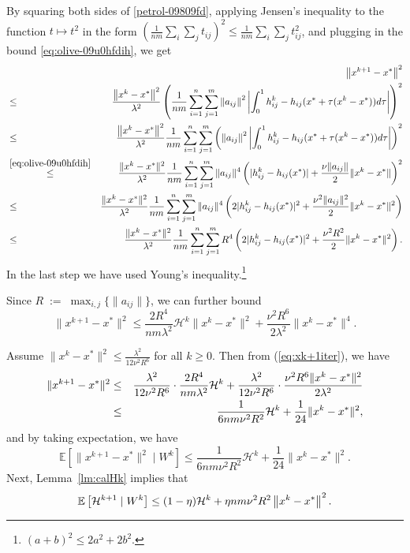 \documentclass[12pt]{article}
\newcommand{\eqdef}{\; { := }\;}
\newcommand{\ExpBr}[1]{\mathbb{E}\left[#1\right]}
\newcommand{\norm}[1]{\left\|#1\right\|}
\newcommand{\cH}{{\mathcal{H}}}
\begin{document}
\noindent By squaring both sides of \eqref{petrol-09809fd},  applying Jensen's inequality to the function $t\mapsto t^2$ in the form $\left(\frac{1}{nm}\sum_i \sum_j t_{ij}\right)^2 \leq \frac{1}{nm}\sum_i \sum_j t^2_{ij}$, and plugging in the bound \eqref{eq:olive-09u0hfdih}, we get
\begin{eqnarray*}	
&&\norm{ x^{k+1} - x^* }^2\\
&\leq&  \frac{ \norm{x^k - x^*}^2}{ \lambda^2} \left(\frac{1}{nm} \sum_{i=1}^n \sum_{j=1}^{m} \norm{a_{ij}}^2 \left|   \int_{0}^1 h_{ij}^k - h_{ij}(x^* + \tau(x^k - x^*))  d\tau  \right| \right)^2 \\
&\leq &\frac{ \norm{x^k - x^*}^2}{ \lambda^2} \frac{1}{nm} \sum_{i=1}^n \sum_{j=1}^{m} \left( \norm{a_{ij}}^2  \left| \int_{0}^1 h_{ij}^k - h_{ij}(x^* + \tau(x^k - x^*))  d\tau  \right|\right)^2 \\
&\overset{\eqref{eq:olive-09u0hfdih}}{\leq}&  \frac{\|x^k-x^*\|^2}{ \lambda^2} \frac{1}{nm}\sum_{i=1}^n \sum_{j=1}^{m} \|a_{ij}\|^4 \left(   |h_{ij}^k - h_{ij}(x^*)| + \frac{\nu \|a_{ij}\|}{2} \|x^k-x^*\|  \right)^2 \\ 
&\leq&  \frac{\|x^k-x^*\|^2}{ \lambda^2} \frac{1}{nm}\sum_{i=1}^n \sum_{j=1}^{m} \|a_{ij}\|^4 \left(   2|h_{ij}^k - h_{ij}(x^*)|^2 + \frac{\nu^2 \|a_{ij}\|^2}{2} \|x^k-x^*\|^2  \right) \\
&\leq & \frac{\|x^k-x^*\|^2}{ \lambda^2} \frac{1}{nm}\sum_{i=1}^n \sum_{j=1}^{m} R^4 \left(   2|h_{ij}^k - h_{ij}(x^*)|^2 + \frac{\nu^2 R^2}{2} \|x^k-x^*\|^2  \right).
\end{eqnarray*}
In the last step we have used Young's inequality.\footnote{$(a+b)^2 \leq 2a^2 + 2b^2$.}


\noindent Since $R\eqdef \max_{i, j} \{ \|a_{ij}\| \}$, we can further bound
\begin{equation}\label{eq:xk+1iter}
\|x^{k+1} - x^*\|^2 \leq \frac{2 R^4}{nm\lambda^2}  \cH^k \|x^k-x^*\|^2 + \frac{ \nu^2 R^6}{2\lambda^2}\|x^k-x^*\|^4. 
\end{equation}


\noindent Assume $\|x^k - x^*\|^2 \leq \frac{\lambda^2}{12\nu^2R^6}$ for all $k\geq 0$. Then from (\ref{eq:xk+1iter}), we have 
\begin{eqnarray*}
	\|x^{k+1} - x^*\|^2 &\leq& \frac{\lambda^2}{12\nu^2 R^6} \cdot \frac{2R^4}{nm\lambda^2} \cH^k + \frac{\lambda^2}{12\nu^2 R^6} \cdot \frac{ \nu^2 R^6\|x^k-x^*\|^2}{2\lambda^2} \\ 
	&\leq& \frac{1}{6nm \nu^2 R^2} {\cal H}^k + \frac{1}{24} \|x^k - x^*\|^2, 
\end{eqnarray*}
and by taking expectation, we have 
\begin{equation}\label{eq:expxk+1}
\ExpBr{ \|x^{k+1} - x^*\|^2 \;|\; W^k } \leq  \frac{1}{6nm \nu^2 R^2}  \cH^k + \frac{1}{24} \|x^k - x^*\|^2. 
\end{equation}
Next, Lemma~\ref{lm:calHk} implies that
\begin{equation}\label{eq:oklah090pop}
\ExpBr{ {\cal H}^{k+1} \;|\; W^k} \leq  (1-\eta) {\cal H}^k +  \eta nm \nu^2 R^2 \norm{x^k - x^*}^2.
\end{equation}
\end{document}
